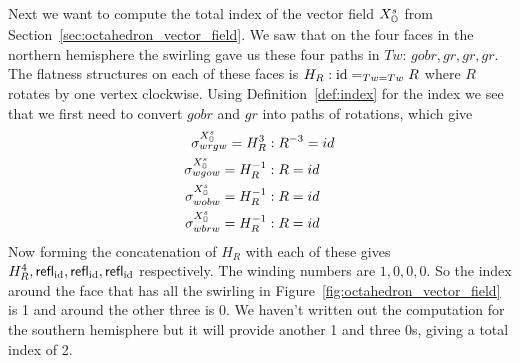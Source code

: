Next we want to compute the total index of the vector field \( X_{\mathbb{O}}^s \) from Section~\ref{sec:octahedron_vector_field}. We saw that on the four faces in the northern hemisphere the swirling gave us these four paths in \( Tw \): \( gobr, gr, gr, gr \). The flatness structures on each of these faces is \( H_R:\text{id}=_{Tw=Tw}R \) where \( R \) rotates by one vertex clockwise. Using Definition~\ref{def:index} for the index we see that we first need to convert \( gobr \) and \( gr \) into paths of rotations, which give
\begin{align*}
\sigma^{X_{\mathbb{O}}^s}_{wrgw}=H_R^3   &:R^{-3}=id \\
\sigma^{X_{\mathbb{O}}^s}_{wgow}=H_R^{-1}&:R=id \\
\sigma^{X_{\mathbb{O}}^s}_{wobw}=H_R^{-1}&:R=id \\
\sigma^{X_{\mathbb{O}}^s}_{wbrw}=H_R^{-1}&:R=id \\
\end{align*}
Now forming the concatenation of \( H_R \) with each of these gives \( H_R^4, \mathsf{refl}_{\text{id}}, \mathsf{refl}_{\text{id}}, \mathsf{refl}_{\text{id}} \) respectively. The winding numbers are \( 1, 0, 0, 0 \). So the index around the face that has all the swirling in Figure~\ref{fig:octahedron_vector_field} is 1 and around the other three is 0. We haven't written out the computation for the southern hemisphere but it will provide another 1 and three 0s, giving a total index of 2.
